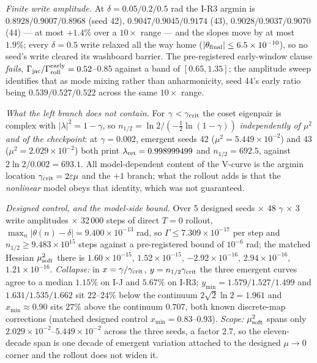 \documentclass{article}
\begin{document}
\emph{Finite write amplitude.} At $\delta=0.05/0.2/0.5$ rad the I-R3 argmin is $0.8928/0.9007/0.8968$ (seed 42), $0.9047/0.9045/0.9174$ (43), $0.9028/0.9037/0.9070$ (44) --- at most $+1.4\%$ over a $10\times$ range --- and the slopes move by at most $1.9\%$; every $\delta=0.5$ write relaxed all the way home ($|\theta_{\rm final}|\le6.5\times10^{-10}$), so no seed's write cleared its washboard barrier. The pre-registered early-window clause \emph{fails}, $\Gamma_{\rm jac}/\Gamma^{\rm early}_{\rm roll}=0.52$--$0.85$ against a band of $[0.65,1.35]$; the amplitude sweep identifies that as mode mixing rather than anharmonicity, seed 44's early ratio being $0.539/0.527/0.522$ across the same $10\times$ range.

\emph{What the left branch does not contain.} For $\gamma<\gamma_{\rm crit}$ the coset eigenpair is complex with $|\lambda|^2=1-\gamma$, so $n_{1/2}=\ln2/(-\tfrac12\ln(1-\gamma))$ \emph{independently of $\mu^2$ and of the checkpoint}: at $\gamma=0.002$, emergent seeds 42 ($\mu^2=5.449\times10^{-2}$) and 43 ($\mu^2=2.029\times10^{-2}$) both print $\lambda_{\rm ret}=0.998999499$ and $n_{1/2}=692.5$, against $2\ln2/0.002=693.1$. All model-dependent content of the V-curve is the argmin location $\gamma_{\rm crit}=2\varepsilon\mu$ and the $+1$ branch; what the rollout adds is that the \emph{nonlinear} model obeys that identity, which was not guaranteed.

\emph{Designed control, and the model-side bound.} Over 5 designed seeds $\times$ 48 $\gamma$ $\times$ 3 write amplitudes $\times$ 32\,000 steps of direct $T=0$ rollout, $\max_n|\theta(n)-\delta|=9.400\times10^{-13}$ rad, so $\Gamma\le7.309\times10^{-17}$ per step and $n_{1/2}\ge9.483\times10^{15}$ steps against a pre-registered bound of $10^{-6}$ rad; the matched Hessian $\mu^2_{\rm soft}$ there is $1.60\times10^{-15}$, $1.52\times10^{-15}$, $-2.92\times10^{-16}$, $2.94\times10^{-16}$, $1.21\times10^{-16}$. \emph{Collapse:} in $x=\gamma/\gamma_{\rm crit}$, $y=n_{1/2}\gamma_{\rm crit}$ the three emergent curves agree to a median $1.15\%$ on I-J and $5.67\%$ on I-R3; $y_{\min}=1.579/1.527/1.499$ and $1.631/1.535/1.662$ sit $22$--$24\%$ below the continuum $2\sqrt2\ln2=1.961$ and $x_{\min}\approx0.90$ sits $27\%$ above the continuum $0.707$, both known discrete-map corrections (matched designed control $x_{\min}=0.83$--$0.93$). \emph{Scope:} $\mu^2_{\rm soft}$ spans only $2.029\times10^{-2}$--$5.449\times10^{-2}$ across the three seeds, a factor $2.7$, so the eleven-decade span is one decade of emergent variation attached to the designed $\mu\to0$ corner and the rollout does not widen it.
\end{document}
